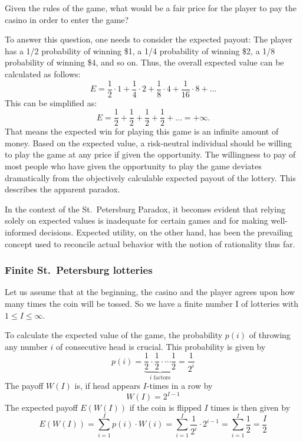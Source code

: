 \documentclass[
  12pt,
  oneside]{book}
\theoremstyle{definition}
\theoremstyle{definition}
\theoremstyle{definition}
\theoremstyle{definition}
\theoremstyle{remark}
\begin{document}
Given the rules of the game, what would be a fair price for the player to pay the casino in order to enter the game?

To answer this question, one needs to consider the expected payout: The player has a 1/2 probability of winning \$1, a 1/4 probability of winning \$2, a 1/8 probability of winning \$4, and so on. Thus, the overall expected value can be calculated as follows:
\[
E = \frac{1}{2} \cdot 1 + \frac{1}{4} \cdot 2 + \frac{1}{8} \cdot 4+ \frac{1}{16} \cdot 8 + \dots 
\]
This can be simplified as:
\[
E = \frac{1}{2} + \frac{1}{2} + \frac{1}{2} + \frac{1}{2} + \dots = + \infty.
\]
That means the expected win for playing this game is an infinite amount of money. Based on the expected value, a risk-neutral individual should be willing to play the game at any price if given the opportunity.
The willingness to pay of most people who have given the opportunity to play the game deviates dramatically from the objectively calculable expected payout of the lottery. This describes the apparent paradox.

In the context of the St.~Petersburg Paradox, it becomes evident that relying solely on expected values is inadequate for certain games and for making well-informed decisions. Expected utility, on the other hand, has been the prevailing concept used to reconcile actual behavior with the notion of rationality thus far.

\subsubsection*{Finite St.~Petersburg lotteries}\label{finite-st.-petersburg-lotteries}

Let us assume that at the beginning, the casino and the player agrees upon how many times the coin will be tossed. So we have a finite number I of lotteries with \(1 \leq I \leq \infty\).

To calculate the expected value of the game, the probability \(p(i)\) of throwing any number \(i\) of consecutive head is crucial. This probability is given by
\[
p(i)=\underbrace{\frac{1}{2} \cdot \frac{1}{2} \cdot \cdots \frac{1}{2}}_{i \text { factors}}=\frac{1}{2^{i}}
\]
The payoff \(W(I)\) is, if head appears \(I\)-times in a row by
\[
W(I)=2^{I-1}
\]
The expected payoff \(E(W(I))\) if the coin is flipped \(I\) times is then given by
\[
E(W(I))=\sum_{i=1}^{I} p(i) \cdot W(i)=\sum_{i=1}^{I} \frac{1}{2^{i}} \cdot 2^{i-1}=\sum_{i=1}^{I} \frac{1}{2}=\frac{I}{2}
\]
\end{document}

